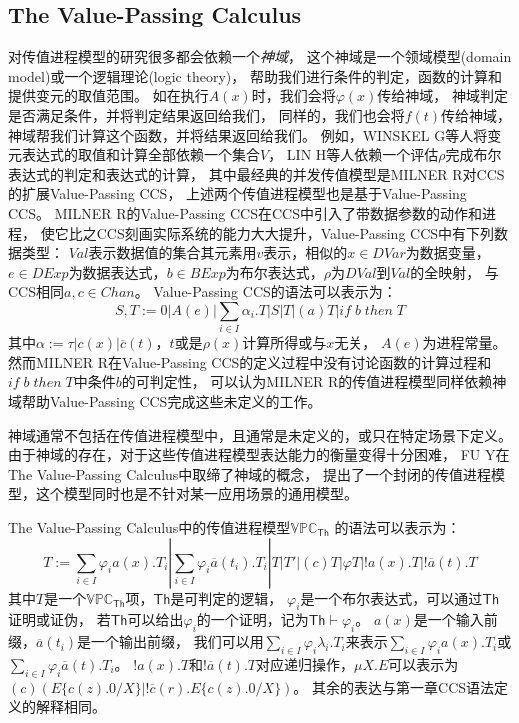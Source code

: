 \subsection{The Value-Passing Calculus}\label{ch:vpc}
对传值进程模型的研究很多都会依赖一个\textit{神域}，
这个神域是一个领域模型(domain model)或一个逻辑理论(logic theory)，
帮助我们进行条件的判定，函数的计算和提供变元的取值范围。
如在执行$A(x)$时，我们会将$\varphi(x)$传给神域，
神域判定是否满足条件，并将判定结果返回给我们，
同样的，我们也会将$f(t)$传给神域，神域帮我们计算这个函数，并将结果返回给我们。
例如，WINSKEL G等人将变元表达式的取值和计算全部依赖一个集合$V$\cite{Oracle_V}，
LIN H等人依赖一个评估$\rho$完成布尔表达式的判定和表达式的计算\cite{Oracle_rho}，
其中最经典的并发传值模型是MILNER R对CCS的扩展Value-Passing CCS\cite{Milner_CCS}，
上述两个传值进程模型也是基于Value-Passing CCS。 
MILNER R的Value-Passing CCS在CCS中引入了带数据参数的动作和进程，
使它比之CCS刻画实际系统的能力大大提升，Value-Passing CCS中有下列数据类型：
$Val$表示数据值的集合其元素用$v$表示，相似的$x\in DVar$为数据变量，
$e\in DExp$为数据表达式，$b\in BExp$为布尔表达式，$\rho$为$DVal$到$Val$的全映射，
与CCS相同$a,c\in Chan$。
Value-Passing CCS的语法可以表示为：
$$S,T:=0|A(e)|\sum_{i\in I}\alpha_i.T|S|T|(a)T|if\;b\;then\;T$$
其中$\alpha:=\tau|c(x)|\overline{c}(t)$，$t$或是$\rho(x)$计算所得或与$x$无关，
$A(e)$为进程常量\cite{VPCCS}。
然而MILNER R在Value-Passing CCS的定义过程中没有讨论函数的计算过程和$if\;b\;then\;T$中条件$b$的可判定性，
可以认为MILNER R的传值进程模型同样依赖神域帮助Value-Passing CCS完成这些未定义的工作。

神域通常不包括在传值进程模型中，且通常是未定义的，或只在特定场景下定义。
由于神域的存在，对于这些传值进程模型表达能力的衡量变得十分困难，
FU Y在The Value-Passing Calculus中取缔了神域的概念，
提出了一个封闭的传值进程模型\cite{Fu_VPC}，这个模型同时也是不针对某一应用场景的通用模型。

The Value-Passing Calculus中的传值进程模型$\mathbb{VPC}_{\mathsf{Th}}$
的语法可以表示为：
\begin{equation}\label{eq:vpc}
   T:=\sum_{i\in I}\varphi_i a(x).T_i|\sum_{i\in I}\varphi_i\overline{a}(t_i).T_i|T|T'|(c)T|\varphi T|!a(x).T|!\overline{a}(t).T
\end{equation}
其中$T$是一个$\mathbb{VPC}_{\mathsf{Th}}$项，$\mathsf{Th}$是可判定的逻辑，
$\varphi_i$是一个布尔表达式，可以通过$\mathsf{Th}$证明或证伪，
若$\mathsf{Th}$可以给出$\varphi_i$的一个证明，记为$\mathsf{Th}\vdash \varphi_i$。
$a(x)$是一个输入前缀，$\overline{a}(t_i)$是一个输出前缀，
我们可以用$\sum_{i\in I}\varphi_i\lambda_i.T_i$来表示$\sum_{i\in I}\varphi_i a(x).T_i$或$\sum_{i\in I}\varphi_i \overline{a}(t).T_i$。
$!a(x).T$和$!\overline{a}(t).T$对应递归操作，$\mu X.E$可以表示为
$(c)(E\{c(z).0/X\}|!\overline{c}(r).E\{c(z).0/X\})$。
其余的表达与第一章CCS语法定义的解释相同。

